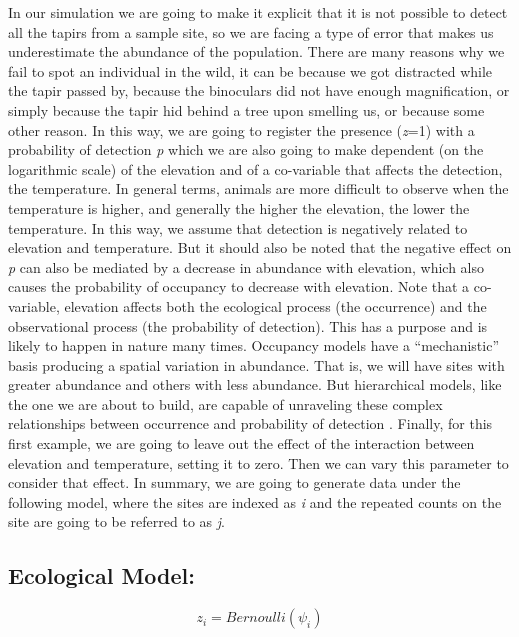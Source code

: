 \documentclass[
]{book}
\begin{document}
In our simulation we are going to make it explicit that it is not possible to detect all the tapirs from a sample site, so we are facing a type of error that makes us underestimate the abundance of the population. There are many reasons why we fail to spot an individual in the wild, it can be because we got distracted while the tapir passed by, because the binoculars did not have enough magnification, or simply because the tapir hid behind a tree upon smelling us, or because some other reason. In this way, we are going to register the presence (\emph{z}=1) with a probability of detection \emph{p} which we are also going to make dependent (on the logarithmic scale) of the elevation and of a co-variable that affects the detection, the temperature. In general terms, animals are more difficult to observe when the temperature is higher, and generally the higher the elevation, the lower the temperature. In this way, we assume that detection is negatively related to elevation and temperature. But it should also be noted that the negative effect on \emph{p} can also be mediated by a decrease in abundance with elevation, which also causes the probability of occupancy to decrease with elevation. Note that a co-variable, elevation affects both the ecological process (the occurrence) and the observational process (the probability of detection). This has a purpose and is likely to happen in nature many times. Occupancy models have a ``mechanistic'' basis producing a spatial variation in abundance. That is, we will have sites with greater abundance and others with less abundance. But hierarchical models, like the one we are about to build, are capable of unraveling these complex relationships between occurrence and probability of detection \citep{Kery2008, KERY2008, Kery2012}. Finally, for this first example, we are going to leave out the effect of the interaction between elevation and temperature, setting it to zero. Then we can vary this parameter to consider that effect. In summary, we are going to generate data under the following model, where the sites are indexed as \emph{i} and the repeated counts on the site are going to be referred to as \emph{j}.

\hypertarget{ecological-model}{%
\subsection{Ecological Model:}\label{ecological-model}}

\begin{equation} 
z _{i} = Bernoulli (\psi _{i})
  \label{eq:binom}
\end{equation}
\end{document}
